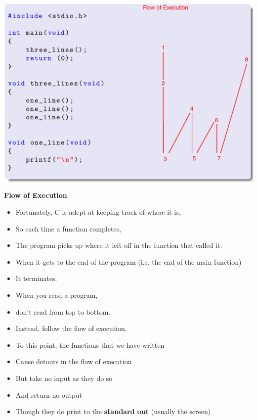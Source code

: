 \documentclass{beamer}
\begin{document}
\begin{frame}
\includegraphics[scale=0.165]{Code1.png}
\end{frame}

\begin{frame}
\textbf{ Flow of Execution}
\begin{itemize}
\item Fortunately, C is adept at keeping track of where it is, 
\item So each time a function completes, 
\item The program picks up where it left off in the function that called it. 
\item When it gets to the end of the program (i.e. the end of the main function)
\item It terminates.
\end{itemize}
\end{frame}

\begin{frame}
\begin{itemize}
\item When you read a program, 
\item don’t read from top to bottom. 
\item Instead, follow the flow of execution. 
\end{itemize}
\end{frame}

\begin{frame}
\begin{itemize}
\item To this point, the functions that we have written
\end{itemize}
\begin{itemize}
\item Cause detours in the flow of execution
\item But take no input as they do so
\item And return no output
\item Though they do print to the \textbf{standard out} (usually the screen)
\end{itemize}
\end{frame}
\end{document}
